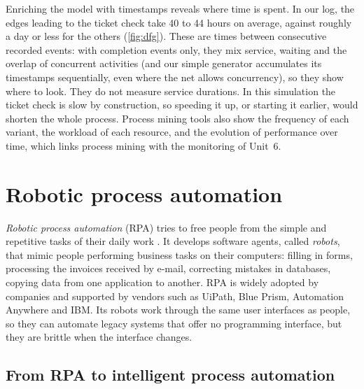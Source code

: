 Enriching the model with timestamps reveals where time is spent. In our log, the edges leading to the
ticket check take 40 to 44 hours on average, against roughly a day or less for the others (\cref{fig:dfg}). These are times between
consecutive recorded events: with completion events only, they mix service, waiting and the overlap of
concurrent activities (and our simple generator accumulates its timestamps sequentially, even where the
net allows concurrency), so they show where to look. They do not measure service durations. In this
simulation the ticket check is slow by construction, so speeding it up, or starting it earlier, would
shorten the whole process. Process mining tools also
show the frequency of each variant, the workload of each resource, and the evolution of performance over
time, which links process mining with the monitoring of Unit~6.

\section{Robotic process automation}\label{sec:rpa}

\emph{Robotic process automation} (RPA) tries to free people from the simple and repetitive tasks of
their daily work \citep{vanderaalst2018robotic,syed2020robotic}. It develops software agents, called
\emph{robots}, that mimic people performing business tasks on their computers: filling in forms,
processing the invoices received by e-mail, correcting mistakes in databases, copying data from one
application to another. RPA is widely adopted by companies and supported by vendors such as UiPath, Blue
Prism, Automation Anywhere and IBM. Its robots work through the same user interfaces as people, so they
can automate legacy systems that offer no programming interface, but they are brittle when the
interface changes.

\subsection{From RPA to intelligent process automation}

